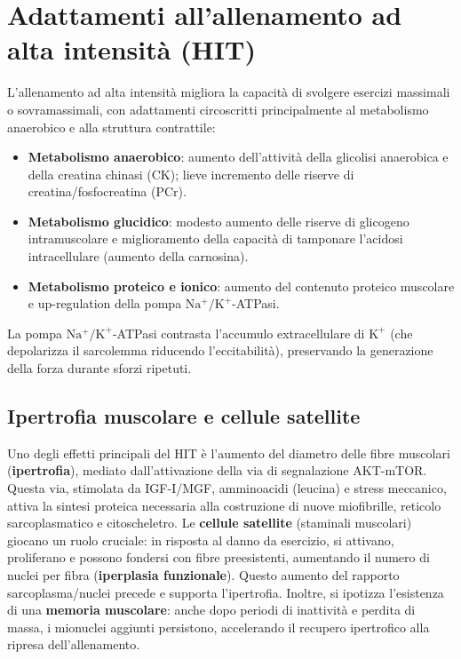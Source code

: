 \documentclass[12pt,a4paper]{report}
\begin{document}
\section{Adattamenti all'allenamento ad alta intensità (HIT)}
L'allenamento ad alta intensità migliora la capacità di svolgere esercizi massimali o sovramassimali, con adattamenti circoscritti principalmente al metabolismo anaerobico e alla struttura contrattile:
\begin{itemize}
\item \textbf{Metabolismo anaerobico}: aumento dell'attività della glicolisi anaerobica e della creatina chinasi (CK); lieve incremento delle riserve di creatina/fosfocreatina (PCr).
\item \textbf{Metabolismo glucidico}: modesto aumento delle riserve di glicogeno intramuscolare e miglioramento della capacità di tamponare l'acidosi intracellulare (aumento della carnosina).
\item \textbf{Metabolismo proteico e ionico}: aumento del contenuto proteico muscolare e up-regulation della pompa \(\mathrm{Na^+/K^+}\)-ATPasi.
\end{itemize}
La pompa \(\mathrm{Na^+/K^+}\)-ATPasi contrasta l'accumulo extracellulare di \(\mathrm{K^+}\) (che depolarizza il sarcolemma riducendo l'eccitabilità), preservando la generazione della forza durante sforzi ripetuti.

\subsection{Ipertrofia muscolare e cellule satellite}
Uno degli effetti principali del HIT è l'aumento del diametro delle fibre muscolari (\textbf{ipertrofia}), mediato dall'attivazione della via di segnalazione AKT-mTOR. Questa via, stimolata da IGF-I/MGF, amminoacidi (leucina) e stress meccanico, attiva la sintesi proteica necessaria alla costruzione di nuove miofibrille, reticolo sarcoplasmatico e citoscheletro.
Le \textbf{cellule satellite} (staminali muscolari) giocano un ruolo cruciale: in risposta al danno da esercizio, si attivano, proliferano e possono fondersi con fibre preesistenti, aumentando il numero di nuclei per fibra (\textbf{iperplasia funzionale}). Questo aumento del rapporto sarcoplasma/nuclei precede e supporta l'ipertrofia. Inoltre, si ipotizza l'esistenza di una \textbf{memoria muscolare}: anche dopo periodi di inattività e perdita di massa, i mionuclei aggiunti persistono, accelerando il recupero ipertrofico alla ripresa dell'allenamento.
\end{document}
